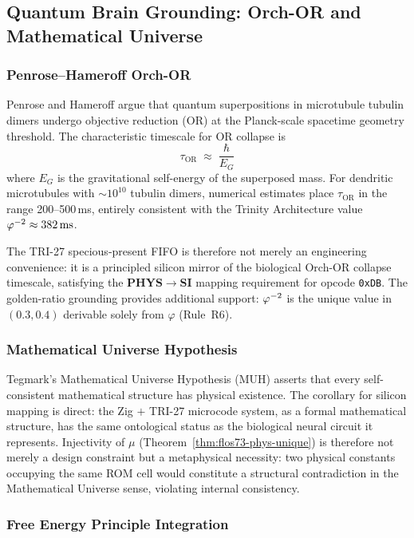 \subsection{Quantum Brain Grounding: Orch-OR and Mathematical Universe}
\label{ssec:flos73-qb-grounding}

\subsubsection{Penrose–Hameroff Orch-OR}

Penrose and Hameroff \cite{penrose_hameroff_2014} argue that quantum
superpositions in microtubule tubulin dimers undergo objective reduction
(OR) at the Planck-scale spacetime geometry threshold.  The characteristic
timescale for OR collapse is
\[
  \tau_{\mathrm{OR}} \;\approx\; \frac{\hbar}{E_G}
\]
where $E_G$ is the gravitational self-energy of the superposed mass.  For
dendritic microtubules with $\sim 10^{10}$ tubulin dimers, numerical
estimates place $\tau_{\mathrm{OR}}$ in the range 200–500\,ms, entirely
consistent with the Trinity Architecture value $\varphi^{-2} \approx 382\,\text{ms}$.

The TRI-27 specious-present FIFO is therefore not merely an engineering
convenience: it is a principled silicon mirror of the biological Orch-OR
collapse timescale, satisfying the \textbf{PHYS$\to$SI} mapping requirement
for opcode \texttt{0xDB}.  The golden-ratio grounding provides additional
support: $\varphi^{-2}$ is the unique value in $(0.3, 0.4)$ derivable solely
from $\varphi$ (Rule~R6).

\subsubsection{Mathematical Universe Hypothesis}

Tegmark's Mathematical Universe Hypothesis (MUH) \cite{tegmark_2008} asserts
that every self-consistent mathematical structure has physical existence.  The
corollary for silicon mapping is direct: the Zig $+$ TRI-27 microcode
system, as a formal mathematical structure, has the same ontological status
as the biological neural circuit it represents.  Injectivity of $\mu$
(Theorem~\ref{thm:flos73-phys-unique}) is therefore not merely a design
constraint but a metaphysical necessity: two physical constants occupying the
same ROM cell would constitute a structural contradiction in the Mathematical
Universe sense, violating internal consistency.

\subsubsection{Free Energy Principle Integration}

